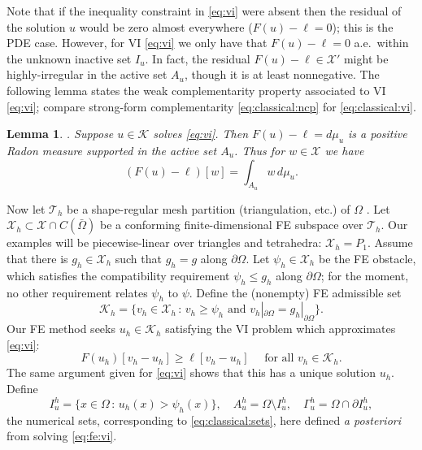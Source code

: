 \documentclass[]{interact}
\theoremstyle{plain}%
\newtheorem{lemma}[theorem]{Lemma}
\theoremstyle{definition}
\theoremstyle{remark}
\newcommand{\cK}{\mathcal{K}}
\newcommand{\cT}{\mathcal{T}}
\newcommand{\cX}{\mathcal{X}}
\begin{document}
Note that if the inequality constraint in \eqref{eq:vi} were absent then the residual of the solution $u$ would be zero almost everywhere ($F(u)-\ell=0$); this is the PDE case.  However, for VI \eqref{eq:vi} we only have that $F(u)-\ell=0$ a.e.~within the unknown inactive set $I_u$.  In fact, the residual $F(u)-\ell\in \cX'$ might be highly-irregular in the active set $A_u$, though it is at least nonnegative.  The following lemma states the weak complementarity property associated to VI \eqref{eq:vi}; compare strong-form complementarity \eqref{eq:classical:ncp} for \eqref{eq:classical:vi}.

\begin{lemma} \label{lem:measure}\cite[Theorem II.6.9]{KinderlehrerStampacchia1980}.  Suppose $u\in \cK$ solves \eqref{eq:vi}.  Then $F(u)-\ell=d\mu_u$ is a positive Radon measure supported in the active set $A_u$.  Thus for $w\in\cX$ we have
\begin{equation}
(F(u)-\ell)[w] = \int_{A_u} w\, d\mu_u. \label{eq:measure}
\end{equation}
\end{lemma}

Now let $\cT_h$ be a shape-regular mesh partition (triangulation, etc.) of $\Omega$ \cite{AinsworthOden2000,ElmanSilvesterWathen2014}.  Let $\cX_h \subset \cX \cap C(\bar\Omega)$ be a conforming finite-dimensional FE subspace over $\cT_h$.  Our examples will be piecewise-linear over triangles and tetrahedra: $\cX_h=P_1$.  Assume that there is $g_h\in\cX_h$ such that $g_h=g$ along $\partial \Omega$.  Let $\psi_h \in \cX_h$ be the FE obstacle, which satisfies the compatibility requirement $\psi_h \le g_h$ along $\partial\Omega$; for the moment, no other requirement relates $\psi_h$ to $\psi$.  Define the (nonempty) FE admissible set
\begin{equation} \label{eq:fe:admissible}
\cK_h = \{v_h \in \cX_h \,:\, v_h \ge \psi_h \text{ and } v_h|_{\partial \Omega} = g_h|_{\partial\Omega}\}.
\end{equation}
Our FE method seeks $u_h\in\cK_h$ satisfying the VI problem which approximates \eqref{eq:vi}:
\begin{equation} \label{eq:fe:vi}
F(u_h)[v_h - u_h] \ge \ell[v_h - u_h] \quad \text{ for all } v_h \in \cK_h.
\end{equation}
The same argument given for \eqref{eq:vi} shows that this has a unique solution $u_h$.  Define
\begin{equation}
  I_u^h = \{x \in \Omega \,:\, u_h(x) > \psi_h(x)\}, \quad A_u^h = \Omega \setminus I_u^h, \quad \Gamma_u^h = \Omega \cap \partial I_u^h, \label{eq:fe:sets}
\end{equation}
the numerical sets, corresponding to \eqref{eq:classical:sets}, here defined \emph{a posteriori} from solving \eqref{eq:fe:vi}.
\end{document}
